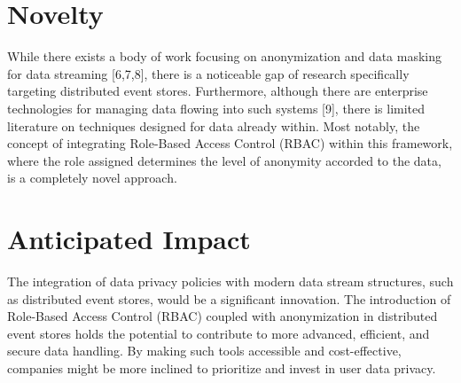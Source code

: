 \section{Novelty \label{sec:scope}}
While there exists a body of work focusing on anonymization and data masking for data streaming [6,7,8], there is a noticeable gap of research specifically targeting distributed event stores. Furthermore, although there are enterprise technologies for managing data flowing into such systems [9], there is limited literature on techniques designed for data already within. Most notably, the concept of integrating Role-Based Access Control (RBAC) within this framework, where the role assigned determines the level of anonymity accorded to the data, is a completely novel approach.

\section{Anticipated Impact \label{sec:outline}}


The integration of data privacy policies with modern data stream structures, such as distributed event stores, would be a significant innovation. The introduction of Role-Based Access Control (RBAC) coupled with anonymization in distributed event stores holds the potential to contribute to more advanced, efficient, and secure data handling. By making such tools accessible and cost-effective, companies might be more inclined to prioritize and invest in user data privacy.



